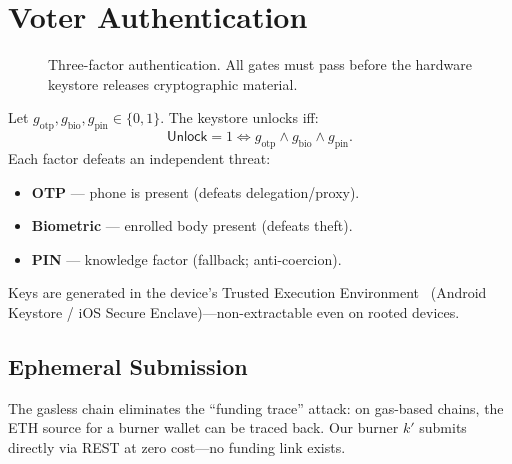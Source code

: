 \documentclass[conference]{IEEEtran}
\theoremstyle{definition}
\theoremstyle{plain}
\begin{document}
\section{Voter Authentication}

\begin{figure}[t]
\centering
{}
\caption{Three-factor authentication. All gates must pass before the hardware keystore releases cryptographic material.}
\label{fig:auth}
\end{figure}

Let $g_{\text{otp}},g_{\text{bio}},g_{\text{pin}}\in\{0,1\}$. The keystore unlocks iff:
\begin{equation}
\mathsf{Unlock}=1\iff g_{\text{otp}}\wedge g_{\text{bio}}\wedge g_{\text{pin}}.
\label{eq:gates}
\end{equation}
Each factor defeats an independent threat:
\begin{itemize}[leftmargin=*,itemsep=2pt,topsep=3pt]
\item \textbf{OTP} --- phone is present (defeats delegation/proxy).
\item \textbf{Biometric} --- enrolled body present (defeats theft).
\item \textbf{PIN} --- knowledge factor (fallback; anti-coercion).
\end{itemize}

Keys are generated in the device's Trusted Execution Environment~\cite{trustzone} (Android Keystore / iOS Secure Enclave)---non-extractable even on rooted devices.

\subsection{Ephemeral Submission}
The gasless chain eliminates the ``funding trace'' attack: on gas-based chains, the ETH source for a burner wallet can be traced back. Our burner $k'$ submits directly via REST at zero cost---no funding link exists.
\end{document}
